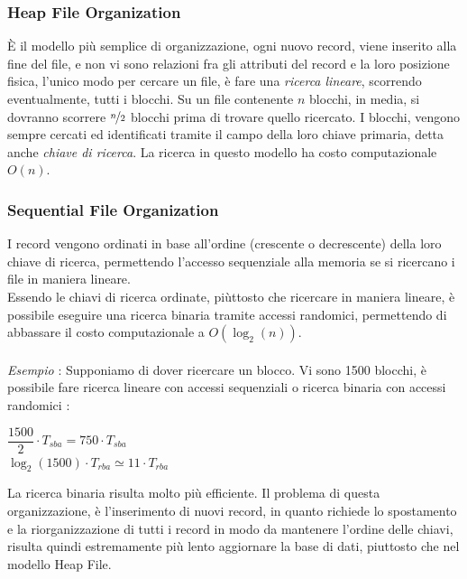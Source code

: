 \documentclass[12pt, letterpaper]{article}
\newcommand{\acc}{\\\hphantom{}\\}
\begin{document}
\subsubsection{Heap File Organization}
È il modello più semplice di organizzazione, ogni nuovo record, viene inserito alla fine del file, e non vi sono relazioni 
fra gli attributi del record e la loro posizione fisica, l'unico modo per cercare un file, è fare una \textit{ricerca 
lineare}, scorrendo eventualmente, tutti i blocchi. Su un file contenente \(n\) blocchi, in media, si dovranno scorrere 
\(\nicefrac{n}{2}\) blocchi prima di trovare quello ricercato. I blocchi, vengono sempre cercati ed identificati tramite il campo 
della loro chiave primaria, detta anche \textit{chiave di ricerca}. La ricerca in questo modello ha costo computazionale \(O(n)\).
\subsubsection{Sequential File Organization}
I record vengono ordinati in base all'ordine (crescente o decrescente) della loro chiave di ricerca, permettendo 
l'accesso sequenziale alla memoria se si ricercano i file in maniera lineare.\\ Essendo le chiavi di ricerca ordinate, piùttosto 
che ricercare in maniera lineare, è possibile eseguire una ricerca binaria tramite accessi randomici, permettendo di 
abbassare il costo computazionale a \(O(\log_2(n))\).\acc \textit{Esempio} : Supponiamo di dover ricercare un blocco. Vi sono 
1500 blocchi, è possibile fare ricerca lineare con accessi sequenziali o ricerca binaria con accessi randomici : \begin{center}
    \(\dfrac{1500}{2}\cdot T_{sba}=750\cdot T_{sba}\)\\\(\log_2(1500)\cdot T_{rba}\simeq 11\cdot T_{rba}\)
\end{center}
La ricerca binaria risulta molto più efficiente. Il problema di questa organizzazione, è l'inserimento di nuovi record, in quanto 
richiede lo spostamento e la riorganizzazione di tutti i record in modo da mantenere l'ordine delle chiavi, risulta quindi estremamente 
più lento aggiornare la base di dati, piuttosto che nel modello Heap File.
\end{document}
